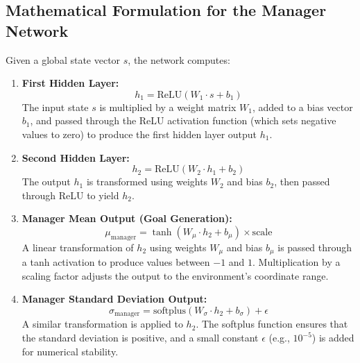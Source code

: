 \documentclass{article}
\begin{document}
\subsection{Mathematical Formulation for the Manager Network}
Given a global state vector \( s \), the network computes:
\begin{enumerate}[label=(\arabic*)]
    \item \textbf{First Hidden Layer:}
    \[
    h_1 = \text{ReLU}(W_1 \cdot s + b_1)
    \]
    The input state \( s \) is multiplied by a weight matrix \( W_1 \), added to a bias vector \( b_1 \), and passed through the ReLU activation function (which sets negative values to zero) to produce the first hidden layer output \( h_1 \).
    
    \item \textbf{Second Hidden Layer:}
    \[
    h_2 = \text{ReLU}(W_2 \cdot h_1 + b_2)
    \]
    The output \( h_1 \) is transformed using weights \( W_2 \) and bias \( b_2 \), then passed through ReLU to yield \( h_2 \).
    
    \item \textbf{Manager Mean Output (Goal Generation):}
    \[
    \mu_{\text{manager}} = \tanh(W_\mu \cdot h_2 + b_\mu) \times \text{scale}
    \]
    A linear transformation of \( h_2 \) using weights \( W_\mu \) and bias \( b_\mu \) is passed through a tanh activation to produce values between \(-1\) and \(1\). Multiplication by a scaling factor adjusts the output to the environment's coordinate range.
    
    \item \textbf{Manager Standard Deviation Output:}
    \[
    \sigma_{\text{manager}} = \text{softplus}(W_\sigma \cdot h_2 + b_\sigma) + \epsilon
    \]
    A similar transformation is applied to \( h_2 \). The softplus function ensures that the standard deviation is positive, and a small constant \( \epsilon \) (e.g., \(10^{-5}\)) is added for numerical stability.
\end{enumerate}
\end{document}
